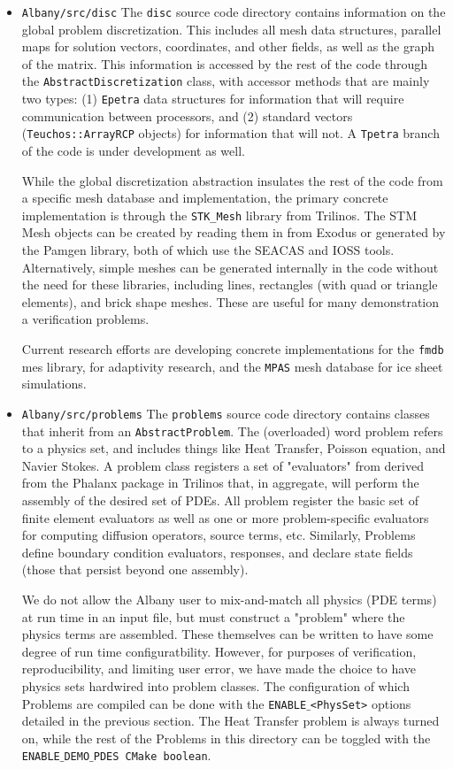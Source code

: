\documentclass[pdf,12pt,report,strict]{SANDreport}
\theoremstyle{remark}
\begin{document}
\begin{itemize}
\item{\texttt{Albany/src/disc}}  The \texttt{disc} source code directory contains information
on the global problem discretization. This includes all mesh data structures, parallel
maps for solution vectors, coordinates, and other fields, as well as the graph of the
matrix. This information is accessed by the rest of the code through the 
\texttt{AbstractDiscretization} class, with accessor methods that are mainly 
two types: (1) \texttt{Epetra} data structures for information that will 
require communication between processors, and (2)
standard vectors (\texttt{Teuchos::ArrayRCP} objects) for information that will not.
A \texttt{Tpetra} branch of the code is under development as well.

While the global discretization abstraction insulates the rest of the code from a
specific mesh database and implementation, the primary concrete implementation
is through the \texttt{STK\_Mesh} library from Trilinos. The STM Mesh objects can be
created by reading them in from Exodus or generated by the Pamgen library, both of
which use the SEACAS and IOSS tools. Alternatively, simple meshes can be generated
internally in the code without the need for these libraries, including lines, 
rectangles (with quad or triangle elements), and brick shape meshes. These are useful
for many demonstration a verification problems.

Current research efforts are developing concrete implementations for the \texttt{fmdb} 
mes library, for adaptivity research, and the \texttt{MPAS} mesh database for 
ice sheet simulations.

\item{\texttt{Albany/src/problems}}  The \texttt{problems} source code directory contains
classes that inherit from an \texttt{AbstractProblem}. The (overloaded) word problem 
refers to a physics set, and includes things like Heat Transfer, Poisson equation, and
Navier Stokes. A problem class registers a set of "evaluators" from derived from the
Phalanx package in Trilinos that, in aggregate, will perform the assembly of the desired
set of PDEs. All problem register the basic set of finite element evaluators as well as
one or more problem-specific evaluators for computing diffusion operators, source terms,
etc. Similarly, Problems define boundary condition evaluators, responses, and declare
state fields (those that persist beyond one assembly). 

We do not allow the Albany user to mix-and-match all physics (PDE terms)
at run time in an input file, but must construct a "problem" where the physics terms
are assembled. These themselves can be written to have some degree of run time configuratbility.
However, for purposes of verification, reproducibility, and limiting user error, we 
have made the choice to have physics sets hardwired into problem classes.
The configuration of which Problems are compiled can be done with the \texttt{ENABLE$\_$<PhysSet>}
options detailed in the previous section. The Heat Transfer problem is always
turned on, while the rest of the Problems in this directory can be toggled with
the \texttt{ENABLE$\_$DEMO$\_$PDES CMake boolean}.


\end{itemize}
\end{document}
